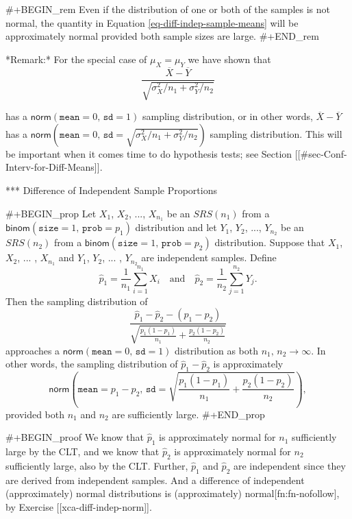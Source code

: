 #+BEGIN_rem
Even if the distribution of one or both of the samples is not normal,
the quantity in Equation \eqref{eq-diff-indep-sample-means} will be
approximately normal provided both sample sizes are large.
#+END_rem

*Remark:* For the special case of \(\mu_{X}=\mu_{Y}\) we have shown
 that
\begin{equation}
\frac{\overline{X} - \overline{Y}}{\sqrt{ \sigma_{X}^{2}/ n_{1} + \sigma_{Y}^{2}/n_{2}}}
\end{equation}

has a \(\mathsf{norm}(\mathtt{mean}=0,\,\mathtt{sd}=1)\) sampling
distribution, or in other words, \(\overline{X} - \overline{Y}\) has a
\(\mathsf{norm}(\mathtt{mean} = 0,\,\mathtt{sd} = \sqrt{\sigma_{X}^{2}
/ n_{1} + \sigma_{Y}^{2} / n_{2}})\) sampling distribution. This will
be important when it comes time to do hypothesis tests; see Section
[[#sec-Conf-Interv-for-Diff-Means]].


*** Difference of Independent Sample Proportions

#+BEGIN_prop
Let \(X_{1}\), \(X_{2}\), ..., \(X_{n_{1}}\) be an \(SRS(n_{1})\) from
a \(\mathsf{binom}(\mathtt{size}=1,\,\mathtt{prob}=p_{1})\)
distribution and let \(Y_{1}\), \(Y_{2}\), ..., \(Y_{n_{2}}\) be an
\(SRS(n_{2})\) from a
\(\mathsf{binom}(\mathtt{size}=1,\,\mathtt{prob}=p_{2})\)
distribution. Suppose that \(X_{1}\), \(X_{2}\), ... , \(X_{n_{1}}\)
and \(Y_{1}\), \(Y_{2}\), ... , \(Y_{n_{2}}\) are independent
samples. Define
\begin{equation}
\hat{p}_{1}=\frac{1}{n_{1}}\sum_{i=1}^{n_{1}}X_{i}\quad \mbox{and}\quad \hat{p}_{2}=\frac{1}{n_{2}}\sum_{j=1}^{n_{2}}Y_{j}.
\end{equation}
Then the sampling distribution of
\begin{equation}
\frac{\hat{p}_{1}-\hat{p}_{2}-(p_{1}-p_{2})}{\sqrt{\frac{p_{1}(1-p_{1})}{n_{1}}+\frac{p_{2}(1-p_{2})}{n_{2}}}}
\end{equation}
approaches a \(\mathsf{norm}(\mathtt{mean}=0,\,\mathtt{sd}=1)\) distribution as both \(n_{1},\, n_{2}\to\infty\). In other words, the sampling distribution of \(\hat{p}_{1}-\hat{p}_{2}\) is approximately
\begin{equation}
\mathsf{norm}\left(\mathtt{mean}=p_{1}-p_{2},\,\mathtt{sd}=\sqrt{\frac{p_{1}(1-p_{1})}{n_{1}}+\frac{p_{2}(1-p_{2})}{n_{2}}}\right),
\end{equation}
provided both \(n_{1}\) and \(n_{2}\) are sufficiently large.
#+END_prop

#+BEGIN_proof
We know that \(\hat{p}_{1}\) is approximately normal for \(n_{1}\)
sufficiently large by the CLT, and we know that \(\hat{p}_{2}\) is
approximately normal for \(n_{2}\) sufficiently large, also by the
CLT. Further, \(\hat{p}_{1}\) and \(\hat{p}_{2}\) are independent
since they are derived from independent samples. And a difference of
independent (approximately) normal distributions is (approximately)
normal[fn:fn-nofollow], by Exercise [[xca-diff-indep-norm]].

